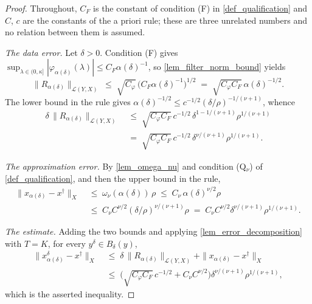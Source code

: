 \documentclass[a4paper]{report}
\theoremstyle{plain}
\theoremstyle{definition}
\theoremstyle{remark}
\newcommand{\Ll}{\mathcal{L}}
\newcommand{\dg}{^{\dagger}}
\begin{document}
\begin{proof}
  Throughout, $C_F$ is the constant of condition (F) in \cref{def_qualification} and
  $C$, $c$ are the constants of the a priori rule; these are three unrelated numbers and
  no relation between them is assumed.

  \emph{The data error.}  Let $\delta > 0$.  Condition (F) gives $\sup_{\lambda \in
  (0,\kappa]}|\varphi_{\alpha(\delta)}(\lambda)| \le C_F\alpha(\delta)^{-1}$, so
  \cref{lem_filter_norm_bound} yields
  \[
    \|R_{\alpha(\delta)}\|_{\Ll(Y,X)} \;\le\; \sqrt{C_{\varphi}}\,
      \bigl(C_F\alpha(\delta)^{-1}\bigr)^{1/2}
      \;=\; \sqrt{C_{\varphi}C_F}\,\alpha(\delta)^{-1/2} .
  \]
  The lower bound in the rule gives $\alpha(\delta)^{-1/2} \le c^{-1/2}
  (\delta/\rho)^{-1/(\nu+1)}$, whence
  \[
    \begin{aligned}
      \delta\,\|R_{\alpha(\delta)}\|_{\Ll(Y,X)}
        &\;\le\; \sqrt{C_{\varphi}C_F}\,c^{-1/2}\,\delta^{1-1/(\nu+1)}\rho^{1/(\nu+1)} \\
        &\;=\; \sqrt{C_{\varphi}C_F}\,c^{-1/2}\,\delta^{\nu/(\nu+1)}\rho^{1/(\nu+1)} .
    \end{aligned}
  \]

  \emph{The approximation error.}  By \cref{lem_omega_nu} and condition (Q$_{\nu}$) of
  \cref{def_qualification}, and then the upper bound in the rule,
  \[
    \begin{aligned}
      \|x_{\alpha(\delta)} - x\dg\|_X
        &\;\le\; \omega_{\nu}(\alpha(\delta))\,\rho
        \;\le\; C_{\nu}\,\alpha(\delta)^{\nu/2}\rho \\
        &\;\le\; C_{\nu}C^{\nu/2}(\delta/\rho)^{\nu/(\nu+1)}\rho
        \;=\; C_{\nu}C^{\nu/2}\delta^{\nu/(\nu+1)}\rho^{1/(\nu+1)} .
    \end{aligned}
  \]

  \emph{The estimate.}  Adding the two bounds and applying
  \cref{lem_error_decomposition} with $T = K$, for every $y^{\delta} \in
  B_{\delta}(y)$,
  \[
    \begin{aligned}
      \|x^{\delta}_{\alpha(\delta)} - x\dg\|_X
        &\;\le\; \delta\,\|R_{\alpha(\delta)}\|_{\Ll(Y,X)}
          + \|x_{\alpha(\delta)} - x\dg\|_X \\
        &\;\le\; \bigl(\sqrt{C_{\varphi}C_F}\,c^{-1/2} + C_{\nu}C^{\nu/2}\bigr)
          \delta^{\nu/(\nu+1)}\rho^{1/(\nu+1)},
    \end{aligned}
  \]
  which is the asserted inequality.


\end{proof}
\end{document}
